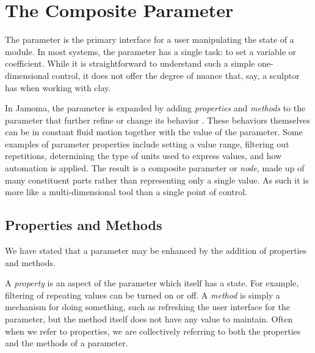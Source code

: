 \documentclass{article}
\begin{document}
\section{The Composite Parameter} %
\label{sec:the_composite_parameter}


The parameter is the primary interface for a user manipulating the state of a module. In most systems, the parameter has a single task: to set a variable or coefficient. While it is straightforward to understand such a simple one-dimensional control, it does not offer the degree of nuance that, say, a sculptor has when working with clay.

In Jamoma, the parameter is expanded by adding \emph{properties} and \emph{methods} to the parameter that further refine or change its behavior \cite{Place:2008}. These behaviors themselves can be in constant fluid motion together with the value of the parameter. Some examples of parameter properties include setting a value range, filtering out repetitions, determining the type of units used to express values, and how automation is applied.  The result is a composite parameter or \emph{node}, made up of many constituent parts rather than representing only a single value. As such it is more like a multi-dimensional tool than a single point of control.

\subsection{Properties and Methods} %
\label{sec:properties_and_methods}

We have stated that a parameter may be enhanced by the addition of properties and methods. 

A \emph{property} is an aspect of the parameter which itself has a state. For example, filtering of repeating values can be turned on or off. A \emph{method} is simply a mechanism for doing something, such as refreshing the user interface for the parameter, but the method itself does not have any value to maintain. Often when we refer to properties, we are collectively referring to both the properties and the methods of a parameter.
\end{document}
